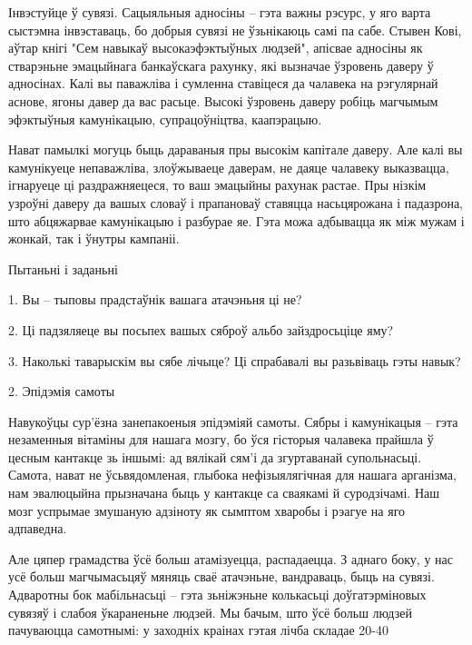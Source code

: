 Інвэстуйце ў сувязі. Сацыяльныя адносіны – гэта важны рэсурс, у яго варта сыстэмна інвэставаць, бо добрыя сувязі не ўзьнікаюць самі па сабе. Стывен Кові, аўтар кнігі "Сем навыкаў высокаэфэктыўных людзей", апісвае адносіны як стварэньне эмацыйнага банкаўскага рахунку, які вызначае ўзровень даверу ў адносінах. Калі вы паважліва і сумленна ставіцеся да чалавека на рэгулярнай аснове, ягоны давер да вас расьце. Высокі ўзровень даверу робіць магчымым эфэктыўныя камунікацыю, супрацоўніцтва, каапэрацыю.

Нават памылкі могуць быць дараваныя пры высокім капітале даверу. Але калі вы камунікуеце непаважліва, злоўжываеце даверам, не даяце чалавеку выказвацца, ігнаруеце ці раздражняецеся, то ваш эмацыйны рахунак растае. Пры нізкім узроўні даверу да вашых словаў і прапановаў ставяцца насьцярожана і падазрона, што абцяжарвае камунікацыю і разбурае яе. Гэта можа адбывацца як між мужам і жонкай, так і ўнутры кампаніі.

Пытаньні і заданьні

1. Вы – тыповы прадстаўнік вашага атачэньня ці не?

2. Ці падзяляеце вы посьпех вашых сяброў альбо зайздросьціце яму?

3. Наколькі таварыскім вы сябе лічыце? Ці спрабавалі вы разьвіваць гэты навык?


2. Эпідэмія самоты

Навукоўцы сур'ёзна занепакоеныя эпідэміяй самоты. Сябры і камунікацыя – гэта незаменныя вітаміны для нашага мозгу, бо ўся гісторыя чалавека прайшла ў цесным кантакце зь іншымі: ад вялікай сям'і да згуртаванай супольнасьці. Самота, нават не ўсьвядомленая, глыбока нефізыялягічная для нашага арганізма, нам эвалюцыйна прызначана быць у кантакце са сваякамі й суродзічамі. Наш мозг успрымае змушаную адзіноту як сымптом хваробы і рэагуе на яго адпаведна.

Але цяпер грамадства ўсё больш атамізуецца, распадаецца. З аднаго боку, у нас усё больш магчымасьцяў мяняць сваё атачэньне, вандраваць, быць на сувязі. Адваротны бок мабільнасьці – гэта зьніжэньне колькасьці доўгатэрміновых сувязяў і слабоя ўкараненьне людзей. Мы бачым, што ўсё больш людзей пачуваюцца самотнымі: у заходніх краінах гэтая лічба складае 20-40%

